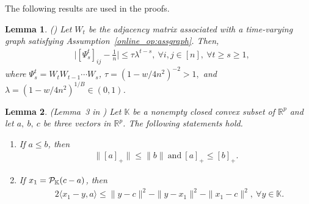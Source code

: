 \documentclass[12pt,draftcls,onecolumn]{IEEEtran}%
\newtheorem{lemma}{Lemma}
\begin{document}
The following results are used in the proofs.

\begin{lemma}\label{online_op:lemma_stoc}
(\cite{nedic2009distributed,nedic2015distributed})
Let $W_{t}$ be the  adjacency matrix associated with a time-varying graph satisfying Assumption~\ref{online_op:assgraph}.
Then,
\begin{align}
&\Big|[\Psi_{s}^{t}]_{ij}-\frac{1}{n}\Big|\le \tau\lambda^{t-s},~\forall i,j\in[n],~\forall t\ge s\ge1,\label{online_op:lemma_stoceqm}
\end{align}
where $\Psi_{s}^{t}=W_tW_{t-1}\cdots W_s$,  $\tau=(1-w/4n^2)^{-2}>1,$ and $\lambda=(1-w/4n^2)^{1/B}\in(0,1)$.
\end{lemma}





\begin{lemma}\label{online_op:lemma_projection}
(Lemma~3  in \cite{yi2019distributed})
Let $\mathbb{K}$ be a nonempty closed convex subset of $\mathbb{R}^{p}$ and let $a,~b,~c$ be three vectors in $\mathbb{R}^{p}$. The following statements hold.
\begin{enumerate}[label=(\alph*)]

\item If $a\le b$, then
\begin{align}
\|[a]_+\|\le\|b\|~\text{and}~[a]_+\le[b]_+.\label{dbco:lemma:projection:ab}
\end{align}

\item If $x_1={\mathcal{P}}_{\mathbb{K}}(c-a)$, then
\begin{align}
&2\langle x_1-y,a \rangle
\le\|y-c\|^2-\|y-x_1\|^2-\|x_1-c\|^2,~\forall y\in\mathbb{K}.\label{dbco:lemma:projection:xy}
\end{align}
\end{enumerate}
\end{lemma}
\end{document}
